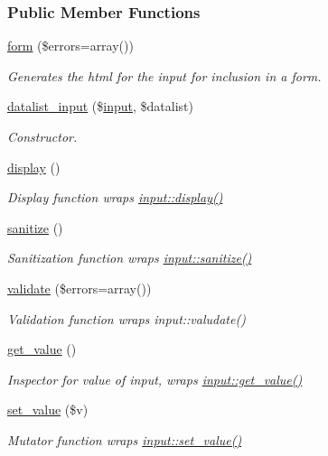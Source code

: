 \subsubsection*{Public Member Functions}
\begin{DoxyCompactItemize}
\item 
\hyperlink{classdatalist__input_aba53bff8ed66c85b97ce1ff23bfc15ec}{form} (\$errors=array())
\begin{DoxyCompactList}\small\item\em Generates the html for the input for inclusion in a form. \end{DoxyCompactList}\item 
\hyperlink{classdatalist__input_a5d082a8f7ebee9b5835490d75128c7e1}{datalist\-\_\-input} (\$\hyperlink{classinput}{input}, \$datalist)
\begin{DoxyCompactList}\small\item\em Constructor. \end{DoxyCompactList}\item 
\hyperlink{classdatalist__input_a6f94bf1247bd5da6f79c864b18073ed5}{display} ()
\begin{DoxyCompactList}\small\item\em Display function wraps \hyperlink{classinput_a993053ef011cade1db0ceaccb1f4da53}{input\-::display()} \end{DoxyCompactList}\item 
\hyperlink{classdatalist__input_a52e50cc544ff141a03c2fc65bfdaf9ea}{sanitize} ()
\begin{DoxyCompactList}\small\item\em Sanitization function wraps \hyperlink{classinput_ab8456d2b5a929801af6fe0b36afd458c}{input\-::sanitize()} \end{DoxyCompactList}\item 
\hyperlink{classdatalist__input_ab2827973f443100315d378d4a97b9516}{validate} (\$errors=array())
\begin{DoxyCompactList}\small\item\em Validation function wraps input\-::valudate() \end{DoxyCompactList}\item 
\hyperlink{classdatalist__input_afeb3a182794c4fb9c235c888b2029430}{get\-\_\-value} ()
\begin{DoxyCompactList}\small\item\em Inspector for value of input, wraps \hyperlink{classinput_a1b3bcdbb596a1154a944a169ac67f547}{input\-::get\-\_\-value()} \end{DoxyCompactList}\item 
\hyperlink{classdatalist__input_a73b5d2cfe2f300a62a39f5dfd5a18e70}{set\-\_\-value} (\$v)
\begin{DoxyCompactList}\small\item\em Mutator function wraps \hyperlink{classinput_a2383e00d55bf3dbcc7071b2fe1336aec}{input\-::set\-\_\-value()} \end{DoxyCompactList}\end{DoxyCompactItemize}
